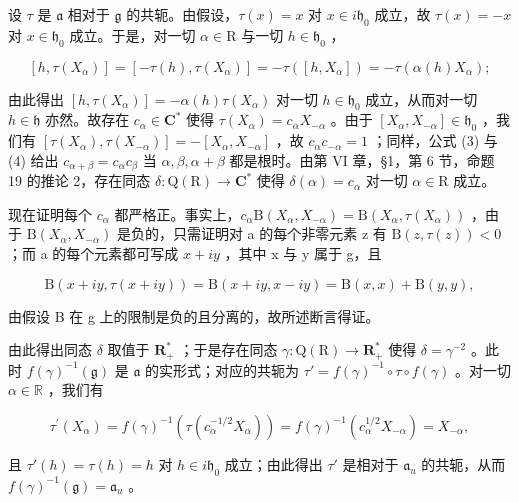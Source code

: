 设 \(\tau\) 是 \(\mathfrak{a}\) 相对于 \(\mathfrak{g}\) 的共轭。由假设，\(\tau(x) = x\) 对 \(x \in i\mathfrak{h}_0\) 成立，故 \(\tau(x) = -x\) 对 \(x \in \mathfrak{h}_0\) 成立。于是，对一切 \(\alpha \in \mathrm{R}\) 与一切 \(h \in \mathfrak{h}_0\) ，

\[
[ h, \tau (X _ {\alpha}) ] = [ - \tau (h), \tau (X _ {\alpha}) ] = - \tau ([ h, X _ {\alpha} ]) = - \tau (\alpha (h) X _ {\alpha});
\]

由此得出 \([h, \tau(X_{\alpha})] = -\alpha(h)\tau(X_{\alpha})\) 对一切 \(h \in \mathfrak{h}_0\) 成立，从而对一切 \(h \in \mathfrak{h}\) 亦然。故存在 \(c_{\alpha} \in \mathbf{C}^*\) 使得 \(\tau(X_{\alpha}) = c_{\alpha}X_{-\alpha}\) 。由于 \([X_{\alpha}, X_{-\alpha}] \in \mathfrak{h}_0\) ，我们有 \([\tau(X_{\alpha}), \tau(X_{-\alpha})] = -[X_{\alpha}, X_{-\alpha}]\) ，故 \(c_{\alpha}c_{-\alpha} = 1\) ；同样，公式 (3) 与 (4) 给出 \(c_{\alpha + \beta} = c_{\alpha}c_{\beta}\) 当 \(\alpha, \beta, \alpha + \beta\) 都是根时。由第 VI 章，§1，第 6 节，命题 19 的推论 2，存在同态 \(\delta: \mathrm{Q}(\mathrm{R}) \to \mathbf{C}^*\) 使得 \(\delta(\alpha) = c_{\alpha}\) 对一切 \(\alpha \in \mathrm{R}\) 成立。

现在证明每个 \(c_{\alpha}\) 都严格正。事实上，\(c_{\alpha}\mathrm{B}(X_{\alpha},X_{-\alpha})=\mathrm{B}(X_{\alpha},\tau(X_{\alpha}))\) ，由于 \(\mathrm{B}(X_{\alpha},X_{-\alpha})\) 是负的，只需证明对 a 的每个非零元素 z 有 \(\mathrm{B}(z,\tau(z))<0\) ；而 a 的每个元素都可写成 \(x+iy\) ，其中 x 与 y 属于 g，且

\[
\mathrm{B} (x + i y, \tau (x + i y)) = \mathrm{B} (x + i y, x - i y) = \mathrm{B} (x, x) + \mathrm{B} (y, y),
\]

由假设 B 在 g 上的限制是负的且分离的，故所述断言得证。

由此得出同态 \(\delta\) 取值于 \(\mathbf{R}_+^*\) ；于是存在同态 \(\gamma : \mathrm{Q}(\mathrm{R}) \to \mathbf{R}_+^*\) 使得 \(\delta = \gamma^{-2}\) 。此时 \(f(\gamma)^{-1}(\mathfrak{g})\) 是 \(\mathfrak{a}\) 的实形式；对应的共轭为 \(\tau' = f(\gamma)^{-1} \circ \tau \circ f(\gamma)\) 。对一切 \(\alpha \in \mathbb{R}\) ，我们有

\[
\tau^ {\prime} (X _ {\alpha}) = f (\gamma) ^ {- 1} (\tau (c _ {\alpha} ^ {- 1 / 2} X _ {\alpha})) = f (\gamma) ^ {- 1} (c _ {\alpha} ^ {1 / 2} X _ {- \alpha}) = X _ {- \alpha},
\]

且 \(\tau'(h) = \tau(h) = h\) 对 \(h \in i\mathfrak{h}_0\) 成立；由此得出 \(\tau'\) 是相对于 \(\mathfrak{a}_u\) 的共轭，从而 \(f(\gamma)^{-1}(\mathfrak{g}) = \mathfrak{a}_u\) 。

